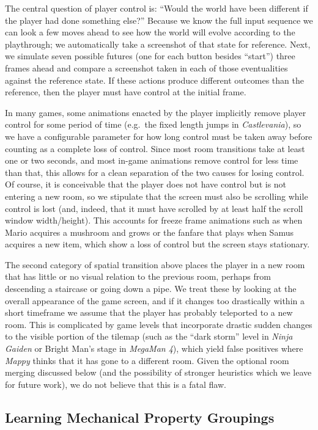 \documentclass[12pt]{report}
\begin{document}
The central question of player control is: ``Would the world have been different if the player had done something else?''
Because we know the full input sequence we can look a few moves ahead to see how the world will evolve according to the playthrough; we automatically take a screenshot of that state for reference.
Next, we simulate seven possible futures (one for each button besides ``start'') three frames ahead and compare a screenshot taken in each of those eventualities against the reference state.
If these actions produce different outcomes than the reference, then the player must have control at the initial frame.

In many games, some animations enacted by the player implicitly remove player control for some period of time (e.g.\ the fixed length jumps in \emph{Castlevania}), so we have a configurable parameter for how long control must be taken away before counting as a complete loss of control.
Since most room transitions take at least one or two seconds, and most in-game animations remove control for less time than that, this allows for a clean separation of the two causes for losing control.
Of course, it is conceivable that the player does not have control but is not entering a new room, so we stipulate that the screen must also be scrolling while control is lost (and, indeed, that it must have scrolled by at least half the scroll window width/height).
This accounts for freeze frame animations such as when Mario acquires a mushroom and grows or the fanfare that plays when Samus acquires a new item, which show a loss of control but the screen stays stationary.

The second category of spatial transition above places the player in a new room that has little or no visual relation to the previous room, perhaps from descending a staircase or going down a pipe.
We treat these by looking at the overall appearance of the game screen, and if it changes too drastically within a short timeframe we assume that the player has probably teleported to a new room.
This is complicated by game levels that incorporate drastic sudden changes to the visible portion of the tilemap (such as the ``dark storm'' level in \emph{Ninja Gaiden} or Bright Man's stage in \emph{MegaMan 4}), which yield false positives where \emph{Mappy} thinks that it has gone to a different room.
Given the optional room merging discussed below (and the possibility of stronger heuristics which we leave for future work), we do not believe that this is a fatal flaw.

\subsection*{Learning Mechanical Property Groupings}
\end{document}
